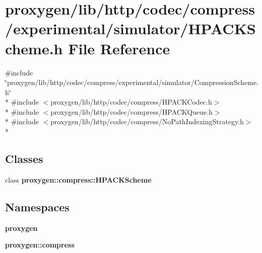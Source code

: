 \section{proxygen/lib/http/codec/compress/experimental/simulator/\+H\+P\+A\+C\+K\+Scheme.h File Reference}
\label{HPACKScheme_8h}
{\ttfamily \#include \char`\"{}proxygen/lib/http/codec/compress/experimental/simulator/\+Compression\+Scheme.\+h\char`\"{}}\\*
{\ttfamily \#include $<$proxygen/lib/http/codec/compress/\+H\+P\+A\+C\+K\+Codec.\+h$>$}\\*
{\ttfamily \#include $<$proxygen/lib/http/codec/compress/\+H\+P\+A\+C\+K\+Queue.\+h$>$}\\*
{\ttfamily \#include $<$proxygen/lib/http/codec/compress/\+No\+Path\+Indexing\+Strategy.\+h$>$}\\*
\subsection*{Classes}
\begin{DoxyCompactItemize}
\item 
class {\bf proxygen\+::compress\+::\+H\+P\+A\+C\+K\+Scheme}
\end{DoxyCompactItemize}
\subsection*{Namespaces}
\begin{DoxyCompactItemize}
\item 
 {\bf proxygen}
\item 
 {\bf proxygen\+::compress}
\end{DoxyCompactItemize}
